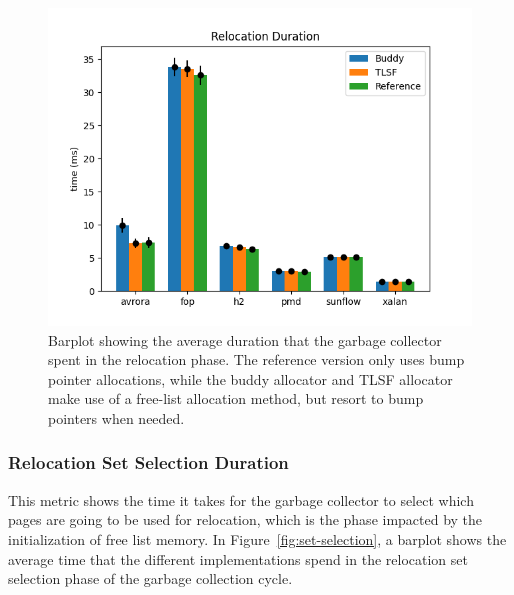 \begin{figure}[H]
\centering
\includegraphics[width=1\textwidth]{figures/relocation2.png}
\caption{Barplot showing the average duration that the garbage collector spent in the relocation phase. The reference version only uses bump pointer allocations, while the buddy allocator and TLSF allocator make use of a free-list allocation method, but resort to bump pointers when needed.}
\label{fig:relocation-duration}
\end{figure}

\subsubsection{Relocation Set Selection Duration}

This metric shows the time it takes for the garbage collector to select which pages are going to be used for relocation, which is the phase impacted by the initialization of free list memory. In Figure~\ref{fig:set-selection}, a barplot shows the average time that the different implementations spend in the relocation set selection phase of the garbage collection cycle.

